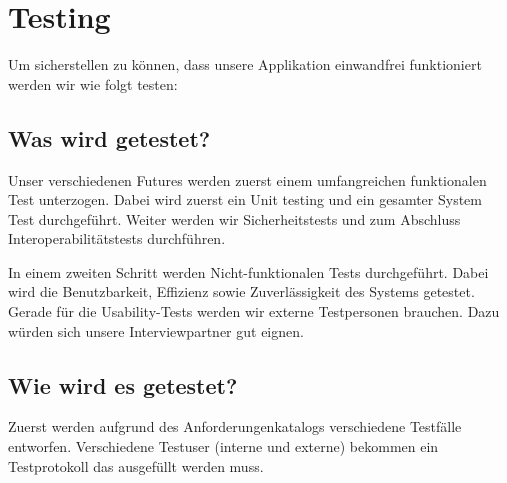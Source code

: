 \chapter{Testing}

Um sicherstellen zu können, dass unsere Applikation einwandfrei funktioniert werden wir wie folgt testen:

\section{Was wird getestet?}

Unser verschiedenen Futures werden zuerst einem umfangreichen funktionalen Test unterzogen. Dabei wird zuerst ein Unit testing und ein gesamter System Test durchgeführt. Weiter werden wir Sicherheitstests und zum Abschluss Interoperabilitätstests durchführen.

In einem zweiten Schritt werden Nicht-funktionalen Tests durchgeführt. Dabei wird die Benutzbarkeit, Effizienz sowie Zuverlässigkeit des Systems getestet. Gerade für die Usability-Tests werden wir externe Testpersonen brauchen. Dazu würden sich unsere Interviewpartner gut eignen.

\section{Wie wird es getestet?}

Zuerst werden aufgrund des Anforderungenkatalogs verschiedene Testfälle entworfen. 
Verschiedene Testuser (interne und externe) bekommen ein Testprotokoll das ausgefüllt werden muss.
